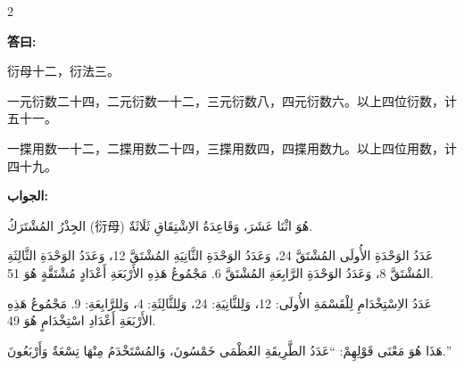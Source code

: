 \documentclass[11pt,a4paper]{article}
\newcommand{\ar}[1]{\arabicfont\beginR #1\endR}
\newenvironment{bilingual}{%
  \begin{paracol}{2}
}{%
  \end{paracol}
}
\newcommand{\cnlabel}[1]{\textcolor{algocolor}{\textbf{#1}}}
\newcommand{\arlabel}[1]{\ar{\textcolor{algocolor}{\textbf{#1}}}}
\begin{document}
\begin{bilingual}

\begin{leftcolumn*}
\cnlabel{答曰:}

衍母十二，衍法三。

一元衍数二十四，二元衍数一十二，三元衍数八，四元衍数六。以上四位衍数，计五十一。

一揲用数一十二，二揲用数二十四，三揲用数四，四揲用数九。以上四位用数，计四十九。
\end{leftcolumn*}

\begin{rightcolumn*}
\arlabel{الجواب:}

\ar{الجِذْرُ المُشْتَرَكُ (衍母) هُوَ اثْنَا عَشَرَ، وَقَاعِدَةُ الاِشْتِقَاقِ ثَلَاثَةٌ.}

\ar{عَدَدُ الوَحْدَةِ الأُولَى المُشْتَقَّ 24، وَعَدَدُ الوَحْدَةِ الثَّانِيَةِ المُشْتَقَّ 12، وَعَدَدُ الوَحْدَةِ الثَّالِثَةِ المُشْتَقَّ 8، وَعَدَدُ الوَحْدَةِ الرَّابِعَةِ المُشْتَقَّ 6. مَجْمُوعُ هَذِهِ الأَرْبَعَةِ أَعْدَادٍ مُشْتَقَّةٍ هُوَ 51.}

\ar{عَدَدُ الاِسْتِخْدَامِ لِلْقَسْمَةِ الأُولَى: 12، وَلِلثَّانِيَةِ: 24، وَلِلثَّالِثَةِ: 4، وَلِلرَّابِعَةِ: 9. مَجْمُوعُ هَذِهِ الأَرْبَعَةِ أَعْدَادِ اسْتِخْدَامٍ هُوَ 49.}

\ar{هَذَا هُوَ مَعْنَى قَوْلِهِمْ: \enquote{عَدَدُ الطَّرِيقَةِ العُظْمَى خَمْسُونَ، وَالمُسْتَخْدَمُ مِنْهَا تِسْعَةٌ وَأَرْبَعُونَ.}}
\end{rightcolumn*}

\end{bilingual}

\vspace{1em}
\end{document}

